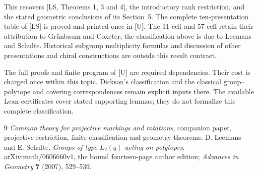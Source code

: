 \documentclass[11pt,a4paper]{article}
\begin{document}
This recovers [LS, Theorems 1, 3 and 4], the introductory rank
restriction, and the stated geometric conclusions of its Section~5. The complete ten-presentation table of [LS] is proved and
printed once in [U]. The 11-cell and 57-cell retain their attribution
to Gr\"unbaum and Coxeter; the classification above is due to Leemans
and Schulte. Historical subgroup multiplicity formulas and discussion
of other presentations and chiral constructions are outside this
result contract.

The full proofs and finite program of [U] are required dependencies.
Their cost is charged once within this topic. Dickson's classification
and the classical group--polytope and covering correspondences remain
explicit inputs there. The available Lean certificates cover stated
supporting lemmas; they do not formalize this complete classification.

\begin{thebibliography}{9}
 \emph{Common theory for projective markings and rotations},
companion paper, projective restriction, finite classification and
geometry theorems.
 D. Leemans and E. Schulte,
\emph{Groups of type $L_2(q)$ acting on polytopes},
arXiv:math/0606660v1, the bound fourteen-page author edition;
\emph{Advances in Geometry} \textbf{7} (2007), 529--539.
\end{thebibliography}
\end{document}

